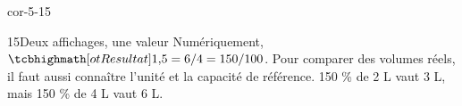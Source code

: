 \begin{blocLivre}{cor-5-15}\begin{corrige}{15}{Deux affichages, une valeur}
Numériquement, $\res{1{,}5=6/4=150/100}$. Pour comparer des volumes réels, il faut aussi connaître l’unité et la capacité de référence. 150 \% de 2 L vaut 3 L, mais 150 \% de 4 L vaut 6 L.
\end{corrige}\end{blocLivre}
